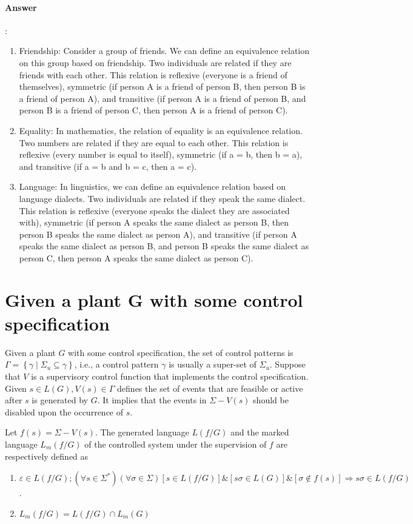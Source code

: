 \documentclass{article}
\begin{document}
\paragraph{Answer}:
\begin{enumerate}
  \item Friendship: Consider a group of friends. We can define an equivalence relation on this group based on friendship. Two individuals are related if they are friends with each other. This relation is reflexive (everyone is a friend of themselves), symmetric (if person A is a friend of person B, then person B is a friend of person A), and transitive (if person A is a friend of person B, and person B is a friend of person C, then person A is a friend of person C).
  \item Equality: In mathematics, the relation of equality is an equivalence relation. Two numbers are related if they are equal to each other. This relation is reflexive (every number is equal to itself), symmetric (if a = b, then b = a), and transitive (if a = b and b = c, then a = c).
  \item Language: In linguistics, we can define an equivalence relation based on language dialects. Two individuals are related if they speak the same dialect. This relation is reflexive (everyone speaks the dialect they are associated with), symmetric (if person A speaks the same dialect as person B, then person B speaks the same dialect as person A), and transitive (if person A speaks the same dialect as person B, and person B speaks the same dialect as person C, then person A speaks the same dialect as person C).
\end{enumerate}


\section{Given a plant G with some control specification}
Given a plant $G$ with some control specification, the set of control patterns is $\Gamma=\left\{\gamma \mid \Sigma_u \subseteq \gamma\right\}$, i.e., a control pattern $\gamma$ is usually a super-set of $\Sigma_u$. Suppose that $V$ is a supervisory control function that implements the control specification. Given $s \in L(G), V(s) \in \Gamma$ defines the set of events that are feasible or active after $s$ is generated by $G$. It implies that the events in $\Sigma-V(s)$ should be disabled upon the occurrence of $s$.

Let $f(s)=\Sigma-V(s)$. The generated language $L(f / G)$ and the marked language $L_m(f / G)$ of the controlled system under the supervision of $f$ are respectively defined as
\begin{enumerate}
  \item $\varepsilon \in L(f / G) ;\left(\forall s \in \Sigma^*\right)(\forall \sigma \in \Sigma)[s \in L(f / G)] \&[s \sigma \in L(G)] \&[\sigma \notin f(s)] \Rightarrow s \sigma \in L(f / G)$.
  \item $L_m(f / G)=L(f / G) \cap L_m(G)$
\end{enumerate}
\end{document}
